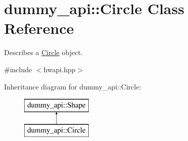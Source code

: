 \hypertarget{classdummy__api_1_1Circle}{}\section{dummy\+\_\+api\+:\+:Circle Class Reference}
\label{classdummy__api_1_1Circle}


Describes a \mbox{\hyperlink{classdummy__api_1_1Circle}{Circle}} object.  




{\ttfamily \#include $<$hwapi.\+hpp$>$}

Inheritance diagram for dummy\+\_\+api\+:\+:Circle\+:\begin{figure}[H]
\begin{center}
\leavevmode
\includegraphics[height=2.000000cm]{classdummy__api_1_1Circle}
\end{center}
\end{figure}
